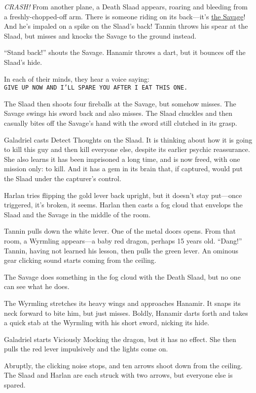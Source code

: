 \documentclass[smalldemyvopaper,11pt,twoside,onecolumn,openright,extrafontsizes]{memoir}
\begin{document}
\emph{CRASH!} From another plane, a Death Slaad appears, roaring and
bleeding from a freshly-chopped-off arm. There is someone riding on its
back---it's \href{/characters/the-savage/}{the Savage}! And he's impaled
on a spike on the Slaad's back! Tannin throws his spear at the Slaad,
but misses and knocks the Savage to the ground instead.

``Stand back!'' shouts the Savage. Hanamir throws a dart, but it bounces
off the Slaad's hide.

In each of their minds, they hear a voice saying:
\texttt{GIVE\ UP\ NOW\ AND\ I’LL\ SPARE\ YOU\ AFTER\ I\ EAT\ THIS\ ONE.}

The Slaad then shoots four fireballs at the Savage, but somehow misses.
The Savage swings his sword back and also misses. The Slaad chuckles and
then casually bites off the Savage's hand with the sword still clutched
in its grasp.

Galadriel casts Detect Thoughts on the Slaad. It is thinking about how
it is going to kill this guy and then kill everyone else, despite its
earlier psychic reassurance. She also learns it has been imprisoned a
long time, and is now freed, with one mission only: to kill. And it has
a gem in its brain that, if captured, would put the Slaad under the
capturer's control.

Harlan tries flipping the gold lever back upright, but it doesn't stay
put---once triggered, it's broken, it seems. Harlan then casts a fog
cloud that envelops the Slaad and the Savage in the middle of the room.

Tannin pulls down the white lever. One of the metal doors opens. From
that room, a Wyrmling appears---a baby red dragon, perhaps 15 years old.
``Dang!'' Tannin, having not learned his lesson, then pulls the green
lever. An ominous gear clicking sound starts coming from the ceiling.

The Savage does something in the fog cloud with the Death Slaad, but no
one can see what he does.

The Wyrmling stretches its heavy wings and approaches Hanamir. It snaps
its neck forward to bite him, but just misses. Boldly, Hanamir darts
forth and takes a quick stab at the Wyrmling with his short sword,
nicking its hide.

Galadriel starts Viciously Mocking the dragon, but it has no effect. She
then pulls the red lever impulsively and the lights come on.

Abruptly, the clicking noise stops, and ten arrows shoot down from the
ceiling. The Slaad and Harlan are each struck with two arrows, but
everyone else is spared.
\end{document}
